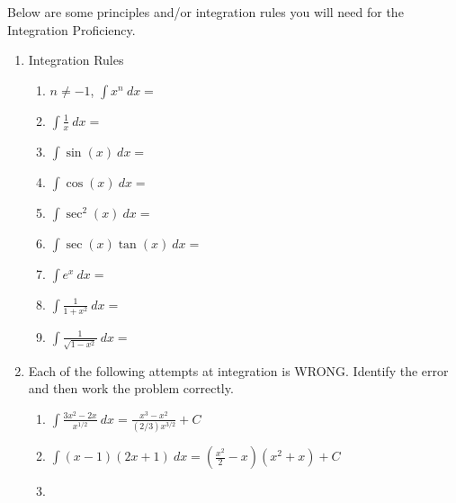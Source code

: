 \documentclass[12pt]{article}
\begin{document}
Below are some principles and/or integration rules you will need for the Integration Proficiency.
\begin{enumerate}
\item Integration Rules\\
\begin{multicols}{2}
	\begin{enumerate}
	\item $n \not= -1$, $\displaystyle \int x^n\: dx=$\\
	
	\item $\displaystyle \int \frac{1}{x}\: dx=$\\
	
	\item $\displaystyle \int \sin(x)\: dx=$\\
	
	\item $\displaystyle \int \cos(x)\: dx=$\\
	
	\item $\displaystyle \int \sec^2(x)\: dx=$\\
	
	\item $\displaystyle \int \sec(x)\tan(x)\: dx=$\\
	
	\item $\displaystyle \int e^x\: dx=$\\
	
	\item $\displaystyle \int \frac{1}{1+x^2}\: dx=$\\	
	
	\item $\displaystyle \int \frac{1}{\sqrt{1-x^2}}\: dx=$\\
	
	\end{enumerate}
\end{multicols}
\item Each of the following attempts at integration is WRONG. Identify the error and then work the problem correctly.\\
	\begin{enumerate}
	\item $\displaystyle \int \frac{3x^2-2x}{x^{1/2}}\: dx=\frac{x^3-x^2}{(2/3)x^{3/2}}+C$
	\vfill
	\item $\displaystyle \int (x-1)(2x+1)\: dx=\left(\frac{x^2}{2}-x\right)(x^2+x)+C$
	\vfill
	\newpage
	\item \quad\\ 
	

\end{enumerate}
\end{enumerate}
\end{document}
